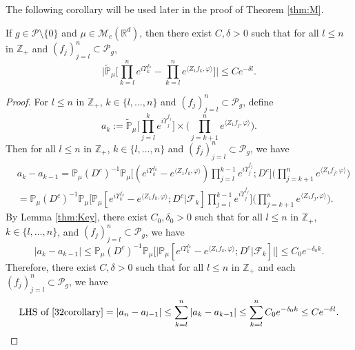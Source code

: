 \documentclass[EJP]{ejpecp} %
\begin{document}
	The following corollary  will be used later in the proof of Theorem \ref{thm:M}.
\begin{corollary}
\label{cor:MI}
	If  $g\in \mathcal{P}\setminus\{0\}$ and $\mu\in \mathcal M_c(\mathbb R^d)$, then there exist $C,\delta>0$ such that for all $l\leq n$ in $\mathbb Z_+$ and  $(f_j)_{j=l}^n\subset \mathcal P_g$,
\begin{equation}
  	\label{32corollary}
  	\Big|\mathbb{\widetilde{P}}_{\mu}\Big[\prod_{k=l}^ne^{i \Upsilon^{f_k}_{k} }-\prod_{k=l}^n e^{\langle Z_1f_k, \varphi\rangle}\Big]\Big|\leq C e^{-\delta l}.
\end{equation}
\end{corollary}
\begin{proof}
	For  $l\leq n$ in $\mathbb Z_+$, $k \in \{l,\dots,n\}$ and $(f_j)_{j=l}^n\subset \mathcal P_g$, define
\[
    a_k
    :=  \mathbb{\widetilde{P}}_{\mu}\Big[\prod_{j=l}^{k} e^{i\Upsilon_j^{f_j}}\Big] \times \Big(\prod_{j=k+1}^{n} e^{ \langle Z_1f_j,\varphi \rangle} \Big).
\]
	Then for all $l\leq n$ in $\mathbb Z_+$, $k \in \{l,\dots,n\}$ and $(f_j)_{j=l}^n\subset \mathcal P_g$, we have
\begin{align}
  	& a_{k} - a_{k-1}
   	=\mathbb{P}_{\mu}(D^c)^{-1} \mathbb{P}_{\mu}\Big[(e^{i\Upsilon^{f_k}_k}-e^{\langle Z_1f_k, \varphi\rangle})\prod_{j=l}^{k-1} e^{i\Upsilon_j^{f_j}};D^c\Big] \Big(\prod_{j=k+1}^n e^{\langle Z_1f_j, \varphi\rangle}\Big)\\
    & =\mathbb{P}_{\mu}(D^c)^{-1} \mathbb{P}_{\mu}\Big[\mathbb P_\mu[e^{i\Upsilon_k^{f_k}}-e^{\langle Z_1f_k, \varphi \rangle}; D^c|\mathscr F_k] \prod_{j=l}^{k-1} e^{i\Upsilon_j^{f_j}}\Big] \Big(\prod_{j=k+1}^{n}e^{\langle Z_1f_j, \varphi\rangle}\Big).
\end{align}
	By Lemma \ref{thm:Key}, there exist $C_0,\delta_0 >0$ such that for all $l\leq n$ in $\mathbb Z_+$,  $k \in \{l,\dots , n\}$, and $(f_j)_{j=l}^n\subset \mathcal P_g$, we have
\[
	| a_{k} - a_{k-1}|
	\leq \mathbb{P}_{\mu}(D^c)^{-1}\mathbb{P}_{\mu}\Big[\big|\mathbb P_\mu[e^{i\Upsilon_k^{f_k}}-e^{\langle Z_1f_k, \varphi \rangle}; D^c | \mathscr{F}_k]\big|\Big]
    \leq C_0 e^{-\delta_0 k}.
\]
	Therefore, there exist $C,\delta >0$ such that for all $l\leq n$ in $\mathbb Z_+$ and each $(f_j)_{j=l}^n\subset \mathcal P_g$, we have%
\[
    \text{LHS of \eqref{32corollary}}
	= \left|a_n-a_{l-1}\right|
   	\leq \sum_{k=l}^n\left|a_{k}-a_{k-1}\right|
    \leq \sum_{k=l}^n C_0 e^{-\delta_0 k}
    \leq C e^{- \delta l}.
    \qedhere
\]
\end{proof}
\end{document}
